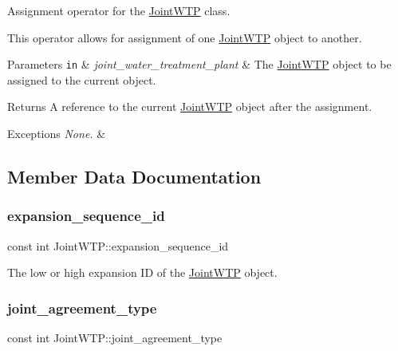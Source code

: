 Assignment operator for the \mbox{\hyperlink{classJointWTP}{Joint\+W\+TP}} class. 

This operator allows for assignment of one {\ttfamily \mbox{\hyperlink{classJointWTP}{Joint\+W\+TP}}} object to another.


\begin{DoxyParams}[1]{Parameters}
\mbox{\tt in}  & {\em joint\+\_\+water\+\_\+treatment\+\_\+plant} & The {\ttfamily \mbox{\hyperlink{classJointWTP}{Joint\+W\+TP}}} object to be assigned to the current object.\\
\hline
\end{DoxyParams}
\begin{DoxyReturn}{Returns}
A reference to the current {\ttfamily \mbox{\hyperlink{classJointWTP}{Joint\+W\+TP}}} object after the assignment.
\end{DoxyReturn}

\begin{DoxyExceptions}{Exceptions}
{\em None.} & \\
\hline
\end{DoxyExceptions}


\subsection{Member Data Documentation}
\mbox{\label{classJointWTP_a0e10a7f7ade04d5f3572f185de1b8653}} 
\subsubsection{\texorpdfstring{expansion\+\_\+sequence\+\_\+id}{expansion\_sequence\_id}}
{\footnotesize\ttfamily const int Joint\+W\+T\+P\+::expansion\+\_\+sequence\+\_\+id}



The low or high expansion ID of the \mbox{\hyperlink{classJointWTP}{Joint\+W\+TP}} object. 

\mbox{\label{classJointWTP_ac5663480c912b1b7cfdfb976b4fa3cec}} 
\subsubsection{\texorpdfstring{joint\+\_\+agreement\+\_\+type}{joint\_agreement\_type}}
{\footnotesize\ttfamily const int Joint\+W\+T\+P\+::joint\+\_\+agreement\+\_\+type}



